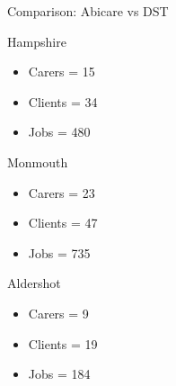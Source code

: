 \documentclass[usenames,dvipsnames]{beamer}
\begin{document}

	


\begin{frame}{Comparison: Abicare vs DST}
\small
\begin{multicols}{3}	
\begin{block}{Hampshire}
	\begin{itemize}
		\setlength{\itemindent}{-.1in}
		\item Carers = 15
		\item Clients = 34
		\item Jobs = 480
	\end{itemize}
\end{block}
\begin{block}{Monmouth}
	\begin{itemize}
		\setlength{\itemindent}{-.1in}
		\item Carers = 23
		\item Clients = 47
		\item Jobs = 735
	\end{itemize}
\end{block}
\begin{block}{Aldershot}
	\begin{itemize}
		\setlength{\itemindent}{-.1in}
		\item Carers = 9
		\item Clients = 19
		\item Jobs = 184
	\end{itemize}
\end{block}
\end{multicols}	
\end{frame}
\end{document}
